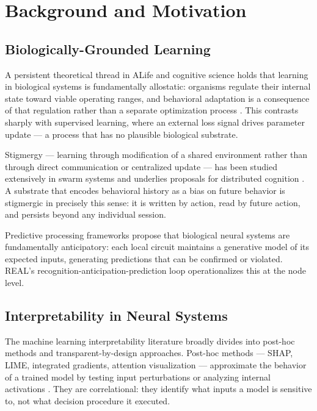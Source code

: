 \documentclass[letterpaper]{article}
\begin{document}
\section{Background and Motivation}

\subsection{Biologically-Grounded Learning}

A persistent theoretical thread in ALife and cognitive science holds that learning in biological systems is fundamentally allostatic: organisms regulate their internal state toward viable operating ranges, and behavioral adaptation is a consequence of that regulation rather than a separate optimization process \citep{placeholder}. This contrasts sharply with supervised learning, where an external loss signal drives parameter update — a process that has no plausible biological substrate.

Stigmergy — learning through modification of a shared environment rather than through direct communication or centralized update — has been studied extensively in swarm systems \citep{placeholder} and underlies proposals for distributed cognition \citep{placeholder}. A substrate that encodes behavioral history as a bias on future behavior is stigmergic in precisely this sense: it is written by action, read by future action, and persists beyond any individual session.

Predictive processing frameworks \citep{placeholder} propose that biological neural systems are fundamentally anticipatory: each local circuit maintains a generative model of its expected inputs, generating predictions that can be confirmed or violated. REAL's recognition-anticipation-prediction loop operationalizes this at the node level.

\subsection{Interpretability in Neural Systems}

The machine learning interpretability literature broadly divides into post-hoc methods and transparent-by-design approaches. Post-hoc methods — SHAP, LIME, integrated gradients, attention visualization — approximate the behavior of a trained model by testing input perturbations or analyzing internal activations \citep{placeholder}. They are correlational: they identify what inputs a model is sensitive to, not what decision procedure it executed.
\end{document}

